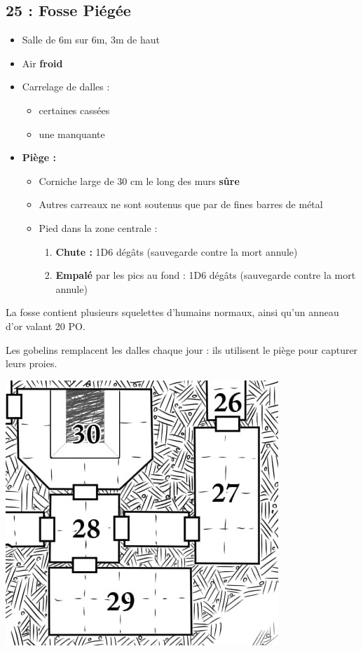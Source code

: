 \subsection{25 : Fosse Piégée}\label{n3:s25}
\begin{itemize}
  \item Salle de 6m sur 6m, 3m de haut 
  \item Air \textbf{froid}
  \item Carrelage de dalles : 
  \begin{itemize}
    \item certaines cassées
    \item une manquante
  \end{itemize}
  \item \textbf{Piège :}
  \begin{itemize}
    \item Corniche large de 30 cm le long des murs \textbf{sûre}
    \item Autres carreaux ne sont soutenus que par de fines barres de métal
    \item Pied dans la zone centrale :
    \begin{enumerate}
      \item \textbf{Chute :} 1D6 dégâts (sauvegarde contre la mort annule)
      \item \textbf{Empalé} par les pics au fond : 1D6 dégâts (sauvegarde contre la mort annule)
    \end{enumerate}
  \end{itemize}
\end{itemize}

La fosse contient plusieurs squelettes d’humains normaux, ainsi qu’un anneau d’or valant 20 PO. 

Les gobelins remplacent les dalles chaque jour : ils utilisent le piège pour capturer leurs proies.

\includegraphics[width=\columnwidth]{pics/map_26-30.jpg}
